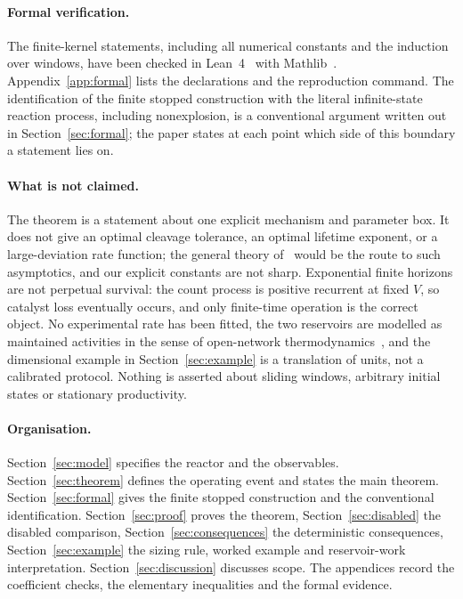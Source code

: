 \documentclass[11pt,a4paper]{article}
\theoremstyle{plain}
\theoremstyle{definition}
\theoremstyle{remark}
\begin{document}
\paragraph{Formal verification.}
The finite-kernel statements, including all numerical constants and the induction over windows, have been checked in Lean~4~\citep{demoura2021} with Mathlib~\citep{mathlib2020}. Appendix~\ref{app:formal} lists the declarations and the reproduction command. The identification of the finite stopped construction with the literal infinite-state reaction process, including nonexplosion, is a conventional argument written out in Section~\ref{sec:formal}; the paper states at each point which side of this boundary a statement lies on.

\paragraph{What is not claimed.}
The theorem is a statement about one explicit mechanism and parameter box. It does not give an optimal cleavage tolerance, an optimal lifetime exponent, or a large-deviation rate function; the general theory of~\citep{agazzi2018} would be the route to such asymptotics, and our explicit constants are not sharp. Exponential finite horizons are not perpetual survival: the count process is positive recurrent at fixed $V$, so catalyst loss eventually occurs, and only finite-time operation is the correct object. No experimental rate has been fitted, the two reservoirs are modelled as maintained activities in the sense of open-network thermodynamics~\citep{polettini2014,rao2016,rao2018}, and the dimensional example in Section~\ref{sec:example} is a translation of units, not a calibrated protocol. Nothing is asserted about sliding windows, arbitrary initial states or stationary productivity.

\paragraph{Organisation.}
Section~\ref{sec:model} specifies the reactor and the observables. Section~\ref{sec:theorem} defines the operating event and states the main theorem. Section~\ref{sec:formal} gives the finite stopped construction and the conventional identification. Section~\ref{sec:proof} proves the theorem, Section~\ref{sec:disabled} the disabled comparison, Section~\ref{sec:consequences} the deterministic consequences, Section~\ref{sec:example} the sizing rule, worked example and reservoir-work interpretation. Section~\ref{sec:discussion} discusses scope. The appendices record the coefficient checks, the elementary inequalities and the formal evidence.
\end{document}
